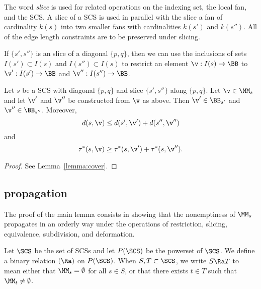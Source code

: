 The word {\it slice} is used for related operations on the indexing
set, the local fan, and the SCS.  A slice of a
SCS is used in parallel with the slice a fan of
cardinality $k(s)$ into two smaller fans with cardinalities $k(s')$ and
$k(s'')$.  
All of the edge length constraints are to be preserved
under slicing.  

If $\{s',s''\}$ is an slice of a diagonal $\{p,q\}$, then we can use
the inclusions of sets $I(s')\subset I(s)$ and $I(s'')\subset I(s)$ to
restrict an element $\v:I(s)\to\BB$ to $\v':I(s')\to \BB$ and
$\v'':I(s'')\to \BB$.  

\begin{lemma}\label{lemma:cover2}
Let $s$ be a SCS with diagonal $\{p,q\}$ and slice
 $\{s',s''\}$ along $\{p,q\}$.
Let $\v\in \MM_s$ and let $\v'$ and $\v''$ be constructed from $\v$ as above.
Then  $\v'\in \BB_{s'}$ and $\v''\in \BB_{s''}$.
Moreover,
\begin{equation}
d(s,\v) \le d(s',\v') + d(s'',\v'')
\end{equation}
and
\begin{equation}
\tau^*(s,\v)\ge \tau^*(s,\v')+\tau^*(s,\v'').
\end{equation}
\end{lemma}

\begin{proof} See Lemma~\ref{lemma:cover}.
\end{proof}

\subsection{propagation}

The proof of the main lemma consists in showing that the nonemptiness
of $\MM_s$ propagates in an orderly way under the operations of
restriction, slicing, equivalence, subdivision, and deformation.

\begin{definition}[$\Ra$] 
Let $\SCS$ be the set of SCSs
and let $P(\SCS)$ be the powerset of $\SCS$. 
We define a binary relation $(\Ra)$ on $P(\SCS)$.  When $S,T\subset \SCS$, we write
$S\Ra T$ to mean  either that $\MM_s=\emptyset$ for all $s\in S$,
or that there exists $t\in T$ such that $\MM_t\ne\emptyset$.
\end{definition}

